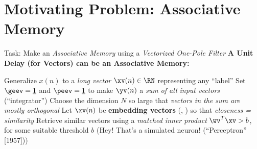 %

%

%

%

\section[\sectopts,toc={Basic Idea}]{Motivating Problem: Associative Memory}

\begin{slide}[\slideopts,toc={One Pole Filter}]{Task: Make an \emph{Associative Memory} using a \emph{Vectorized One-Pole Filter}}
\vspace{-2em}
\maybepause
\vspace{-1em}
\textbf{A Unit Delay (for Vectors) can be an Associative Memory:}
\begin{itemize}
\mpitem Generalize $x(n)$ to a \emph{long vector} $\xv(n)\in\RN$ representing any ``label''
\mpitem Set $\geev = \onevec$ and $\peev = \onevec$ to make $\yv(n)$ a \emph{sum of all input vectors} (``integrator'')
\mpitem Choose the dimension $N$ so large that \emph{vectors in the sum are mostly orthogonal}
\mpitem Let $\xv(n)$ be \textbf{embedding vectors} (\eg, ) so that \emph{closeness = similarity}
\mpitem Retrieve similar vectors using a \emph{matched inner product} $\wv^T\xv > b$,\\
        for some suitable threshold $b$ (Hey!  That's a simulated neuron! (``Perceptron'' [1957]))
\end{itemize}
\end{slide}

